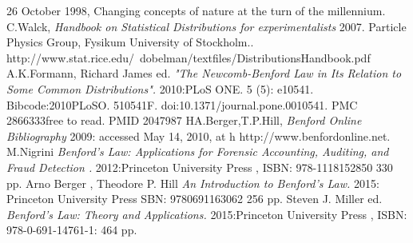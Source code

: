 \documentclass[titlepage,fleqn]{article}%
\begin{document}
\begin{thebibliography}{1}
26 October 1998, Changing concepts of nature at the turn of the millennium.
 C.Walck, {\em Handbook on
Statistical Distributions
for experimentalists } 2007.
Particle Physics Group, Fysikum
University of Stockholm..
http://www.stat.rice.edu/~dobelman/textfiles/DistributionsHandbook.pdf
 A.K.Formann, Richard James ed.
{\em"The Newcomb-Benford Law in Its Relation to Some Common Distributions". }
2010:PLoS ONE. 5 (5): e10541. Bibcode:2010PLoSO.
510541F. doi:10.1371/journal.pone.0010541. PMC 2866333free to read. PMID 2047987
 HA.Berger,T.P.Hill,
{\em Benford Online Bibliography }
2009: accessed May 14, 2010, at h   http://www.benfordonline.net.
 M.Nigrini
{\em
Benford's Law: Applications for Forensic Accounting, Auditing, and Fraud Detection .}
2012:Princeton University Press ,
ISBN:  978-1118152850
330 pp.
 Arno Berger , Theodore P. Hill
{\em An Introduction to Benford's Law.} 2015:
Princeton University Press
SBN: 9780691163062
256 pp.
 Steven J. Miller ed.
{\em Benford's Law: Theory and Applications.}
2015:Princeton University Press ,
ISBN: 978-0-691-14761-1:
464 pp.
\end{thebibliography}%
\end{document}
